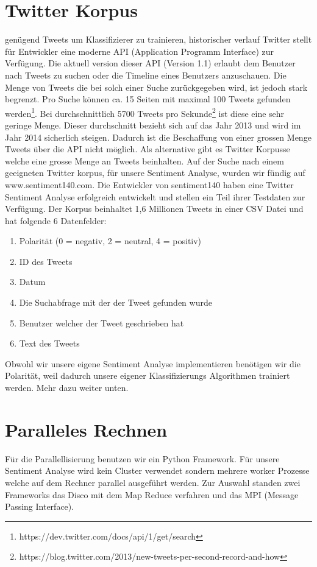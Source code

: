 \documentclass[12pt, oneside]{report}   	%
\begin{document}
\section{Twitter Korpus}
genügend Tweets um Klassifizierer zu trainieren, historischer verlauf
Twitter stellt für Entwickler eine moderne API (Application Programm Interface) zur Verfügung. Die aktuell version dieser API (Version 1.1) erlaubt dem Benutzer nach Tweets zu suchen oder die Timeline eines Benutzers anzuschauen. Die Menge von Tweets die bei solch einer Suche zurückgegeben wird, ist jedoch stark begrenzt. Pro Suche können ca. 15 Seiten mit maximal 100 Tweets gefunden werden\footnote{https://dev.twitter.com/docs/api/1/get/search}. Bei durchschnittlich 5700 Tweets pro Sekunde\footnote{https://blog.twitter.com/2013/new-tweets-per-second-record-and-how} ist diese eine sehr geringe Menge. Dieser durchschnitt bezieht sich auf das Jahr 2013 und wird im Jahr 2014 sicherlich steigen.
Dadurch ist die Beschaffung von einer grossen Menge Tweets über die API nicht möglich. Als alternative gibt es Twitter Korpusse welche eine grosse Menge an Tweets beinhalten. 
\newline{}
Auf der Suche nach einem geeigneten Twitter korpus, für unsere Sentiment Analyse, wurden wir fündig auf www.sentiment140.com. Die Entwickler von sentiment140 haben eine Twitter Sentiment Analyse erfolgreich entwickelt und stellen ein Teil ihrer Testdaten zur Verfügung. Der Korpus beinhaltet 1,6 Millionen Tweets in einer CSV Datei und hat folgende 6 Datenfelder:
\begin{enumerate}
\item Polarität (0 = negativ, 2 = neutral, 4 = positiv)
\item ID des Tweets
\item Datum
\item Die Suchabfrage mit der der Tweet gefunden wurde
\item Benutzer welcher der Tweet geschrieben hat
\item Text des Tweets
\end{enumerate}
Obwohl wir unsere eigene Sentiment Analyse implementieren benötigen wir die Polarität, weil dadurch unsere eigener Klassifizierungs Algorithmen trainiert werden. Mehr dazu weiter unten. 

\section{Paralleles Rechnen}
Für die Parallellisierung benutzen wir ein Python Framework. Für unsere Sentiment Analyse wird kein Cluster verwendet sondern mehrere worker Prozesse welche auf dem Rechner parallel ausgeführt werden. Zur Auswahl standen zwei Frameworks das Disco mit dem Map Reduce verfahren und das MPI (Message Passing Interface). 
\end{document}
